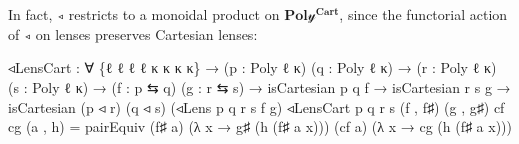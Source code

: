 \documentclass[
  11pt,
  oneside,
  article]{memoir}
\newenvironment{Shaded}{}{}
\newcommand{\NormalTok}[1]{#1}
\newcommand{\OtherTok}[1]{\textcolor[rgb]{0.00,0.44,0.13}{#1}}
\theoremstyle{definition}
\theoremstyle{plain}
\newcommand{\yon}{\mathcal{y}}
\newcommand{\0}{\textsf{0}}
\newcommand{\1}{\tn{\textsf{1}}}
\begin{document}
In fact, \texttt{◃} restricts to a monoidal product on
\(\mathbf{Pol\yon^{Cart}}\), since the functorial action of \texttt{◃} on
lenses preserves Cartesian lenses:

\begin{Shaded}
\begin{Highlighting}[]
\NormalTok{◃LensCart }\OtherTok{:} \OtherTok{∀} \OtherTok{\{}\NormalTok{ℓ ℓ\textquotesingle{} ℓ\textquotesingle{}\textquotesingle{} ℓ\textquotesingle{}\textquotesingle{}\textquotesingle{} κ κ\textquotesingle{} κ\textquotesingle{}\textquotesingle{} κ\textquotesingle{}\textquotesingle{}\textquotesingle{}}\OtherTok{\}}
            \OtherTok{→} \OtherTok{(}\NormalTok{p }\OtherTok{:}\NormalTok{ Poly ℓ κ}\OtherTok{)} \OtherTok{(}\NormalTok{q }\OtherTok{:}\NormalTok{ Poly ℓ\textquotesingle{} κ\textquotesingle{}}\OtherTok{)}
            \OtherTok{→} \OtherTok{(}\NormalTok{r }\OtherTok{:}\NormalTok{ Poly ℓ\textquotesingle{}\textquotesingle{} κ\textquotesingle{}\textquotesingle{}}\OtherTok{)} \OtherTok{(}\NormalTok{s }\OtherTok{:}\NormalTok{ Poly ℓ\textquotesingle{}\textquotesingle{}\textquotesingle{} κ\textquotesingle{}\textquotesingle{}\textquotesingle{}}\OtherTok{)}
            \OtherTok{→} \OtherTok{(}\NormalTok{f }\OtherTok{:}\NormalTok{ p ⇆ q}\OtherTok{)} \OtherTok{(}\NormalTok{g }\OtherTok{:}\NormalTok{ r ⇆ s}\OtherTok{)}
            \OtherTok{→}\NormalTok{ isCartesian p q f }\OtherTok{→}\NormalTok{ isCartesian r s g}
            \OtherTok{→}\NormalTok{ isCartesian }\OtherTok{(}\NormalTok{p ◃ r}\OtherTok{)} \OtherTok{(}\NormalTok{q ◃ s}\OtherTok{)}
                          \OtherTok{(}\NormalTok{◃Lens p q r s f g}\OtherTok{)}
\NormalTok{◃LensCart p q r s }\OtherTok{(}\NormalTok{f , f♯}\OtherTok{)} \OtherTok{(}\NormalTok{g , g♯}\OtherTok{)}\NormalTok{ cf cg }\OtherTok{(}\NormalTok{a , h}\OtherTok{)} \OtherTok{=} 
\NormalTok{    pairEquiv }\OtherTok{(}\NormalTok{f♯ a}\OtherTok{)} \OtherTok{(λ}\NormalTok{ x }\OtherTok{→}\NormalTok{ g♯ }\OtherTok{(}\NormalTok{h }\OtherTok{(}\NormalTok{f♯ a x}\OtherTok{)))} 
              \OtherTok{(}\NormalTok{cf a}\OtherTok{)} \OtherTok{(λ}\NormalTok{ x }\OtherTok{→}\NormalTok{ cg }\OtherTok{(}\NormalTok{h }\OtherTok{(}\NormalTok{f♯ a x}\OtherTok{)))}
\end{Highlighting}
\end{Shaded}
\end{document}
